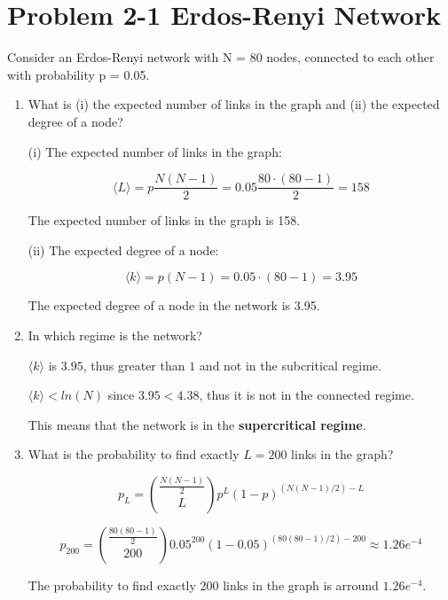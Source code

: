 \section{Problem 2-1 Erdos-Renyi Network}

Consider an Erdos-Renyi network with N = 80 nodes, connected to each other with probability p = 0.05.

\begin{enumerate}
	\item What is (i) the expected number of links in the graph and (ii) the expected degree of a node?
	
	(i) The expected number of links in the graph:
	
	\begin{equation}
	\langle L \rangle = p \frac{N(N-1)}{2} = 0.05 \frac{80 \cdot (80 - 1)}{2} = 158
	\end{equation}
	
	The expected number of links in the graph is 158.
	
	(ii) The expected degree of a node:
	
	\begin{equation}
	\langle k \rangle = p(N-1) = 0.05 \cdot (80 -1) = 3.95
	\end{equation}
	
	The expected degree of a node in the network is 3.95.
	
	\item In which regime is the network?
	
	$\langle k \rangle$ is $3.95$,  thus greater than $1$ and not in the subcritical regime.
	
	$\langle k \rangle < ln(N)$ since $3.95 < 4.38$,  thus it is not in the connected regime.
	
	This means that the network is in the \textbf{supercritical regime}.
	
	\item What is the probability to find exactly $L = 200$ links in the graph?
	
	\begin{equation}
	p_L = {{\frac{N(N-1)}{2}} \choose {L}} p^L (1-p)^{(N(N-1)/2)-L}
	\end{equation}
	
	\begin{equation}
	p_{200} = {{\frac{80(80-1)}{2}} \choose {200}} 0.05^{200} (1-0.05)^{(80(80-1)/2)-200} \approx 1.26e^{-4}
	\end{equation}
	
	The probability to find exactly 200 links in the graph is arround $1.26e^{-4}$.
	

\end{enumerate}
